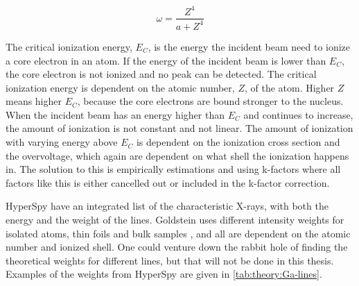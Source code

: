 \begin{equation}
    \label{eq:empirical:fluorescentyieldapprox}
    \omega = \frac{Z^4}{a + Z^4}
\end{equation}

The critical ionization energy, $E_C$, is the energy the incident beam need to ionize a core electron in an atom.
If the energy of the incident beam is lower than $E_C$, the core electron is not ionized and no peak can be detected.
The critical ionization energy is dependent on the atomic number, $Z$, of the atom.
Higher $Z$ means higher $E_C$, because the core electrons are bound stronger to the nucleus.
When the incident beam has an energy higher than $E_C$ and continues to increase, the amount of ionization is not constant and not linear.
The amount of ionization with varying energy above $E_C$ is dependent on the ionization cross section and the overvoltage, which again are dependent on what shell the ionization happens in.
The solution to this is empirically estimations and using k-factors where all factors like this is either cancelled out or included in the k-factor correction.


HyperSpy have an integrated list of the characteristic X-rays, with both the energy and the weight of the lines.
Goldstein uses different intensity weights for isolated atoms, thin foils and bulk samples \cite[Ch. 4.2.6]{goldstein_scanning_2018}, and all are dependent on the atomic number and ionized shell.
One could venture down the rabbit hole of finding the theoretical weights for different lines, but that will not be done in this thesis.
Examples of the weights from HyperSpy are given in \cref{tab:theory:Ga-lines}.


